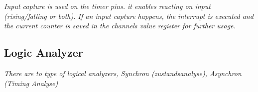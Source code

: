 \textit{
    Input capture is used on the timer pins. it enables
    reacting on input (rising/falling or both).\newline
    If an input capture happens, the interrupt is
    executed and the current counter is saved in the channels
    value register for further usage.
}

\subsection{Logic Analyzer}

\textit{
    There are to type of logical analyzers,
    Synchron (zustandsanalyse), Asynchron (Timing Analyse)
}
